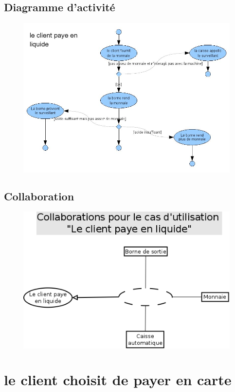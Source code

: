 \documentclass[a4paper]{article}
\begin{document}
\subsection{Diagramme d'activit\'e}
\begin{figure}[!ht]
\centering
\includegraphics[scale=.5]{imgs/act_payerliquide.jpg}
\end{figure}

\subsection{Collaboration}
\begin{figure}[!ht]
\centering
\includegraphics[scale=.5]{collaborations/_liquide.png}
\end{figure}

\newpage

\section{le client choisit de payer en carte}
\end{document}
